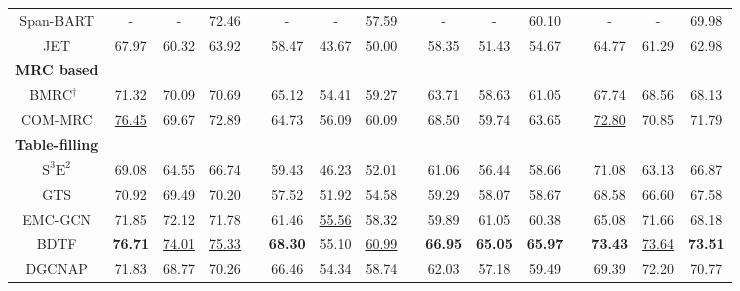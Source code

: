 \documentclass[11pt]{article}
\begin{document}
\begin{table}[ht]
{\begin{tabular}{cccccccccccccccc}
    Span-BART \textrm{\cite{yan2021unified}} & -     & -     & 72.46 &       & -     & -     & 57.59 &       & -     & -     & 60.10 &       & -     & -     & 69.98 \\
    JET \textrm{\cite{xu2020position}}   & 67.97 & 60.32 & 63.92 &       & 58.47 & 43.67 & 50.00 &       & 58.35 & 51.43 & 54.67 &       & 64.77 & 61.29 & 62.98 \\
    \midrule
    \textbf{MRC based} &       &       &       &       &       &       &       &       &       &       &       &       &       &       &  \\
    BMRC$^\dagger$\ \textrm{\cite{chen2021bidirectional}}  & 71.32 & 70.09 & 70.69 &       & 65.12 & 54.41 & 59.27 &       & 63.71 & 58.63 & 61.05 &       & 67.74 & 68.56 & 68.13 \\
    COM-MRC \textrm{\cite{zhai2022mrc}} & \underline{76.45} & 69.67 & 72.89 &       & 64.73 & 56.09 & 60.09 &       & 68.50 & 59.74 & 63.65 &       & \underline{72.80} & 70.85 & 71.79 \\
    \midrule
    \textbf{Table-filling} &       &       &       &       &       &       &       &       &       &       &       &       &       &       &  \\
    $\mathrm{S}^3\mathrm{E}^2$ \textrm{\cite{chen2021semantic}} & 69.08 & 64.55 & 66.74 &       & 59.43 & 46.23 & 52.01 &       & 61.06 & 56.44 & 58.66 &       & 71.08 & 63.13 & 66.87 \\
    GTS \textrm{\cite{wu2020grid}}   & 70.92 & 69.49 & 70.20 &       & 57.52 & 51.92 & 54.58 &       & 59.29 & 58.07 & 58.67 &       & 68.58 & 66.60 & 67.58 \\
    EMC-GCN \textrm{\cite{chen2022enhanced}} & 71.85 & 72.12 & 71.78 &       & 61.46 & \underline{55.56} & 58.32 &       & 59.89 & 61.05 & 60.38 &       & 65.08 & 71.66 & 68.18 \\
    BDTF \textrm{\cite{zhang2022boundary}} & \textbf{76.71} & \underline{74.01} & \underline{75.33} &       & \textbf{68.30}  & 55.10  & \underline{60.99} &       & \textbf{66.95} & \textbf{65.05} & \textbf{65.97} &       & \textbf{73.43} & \underline{73.64} & \textbf{73.51} \\
    DGCNAP \textrm{\cite{li2023dual}} & 71.83 & 68.77 & 70.26 &       & 66.46 & 54.34 & 58.74 &       & 62.03 & 57.18  & 59.49 &       & 69.39 & 72.20 & 70.77 \\
    \midrule


\end{tabular}}
\end{table}
\end{document}
